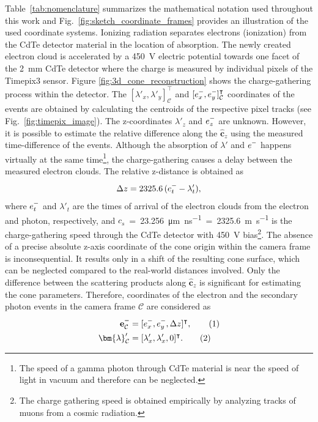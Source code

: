 \documentclass[a4paper,11pt,titlepage,twoside]{book}
\newcommand\numberthis{\addtocounter{equation}{1}\tag{\theequation}}
\newcommand{\reffig}[1]{Fig.~\ref{#1}}
\newcommand{\minus}{\scalebox{0.75}[1.0]{$-$}}
\begin{document}
Table~\ref{tab:nomenclature} summarizes the mathematical notation used throughout this work and \reffig{fig:sketch_coordinate_frames} provides an illustration of the used coordinate systems.
Ionizing radiation separates electrons (ionization) from the \ac{CdTe} detector material in the location of absorption.
The newly created electron cloud is accelerated by a \SI{450}{\volt} electric potential towards one facet of the \SI{2}{\milli\meter} \ac{CdTe} detector where the charge is measured by individual pixels of the Timepix3 sensor.
Figure \ref{fig:3d_cone_reconstruction} shows the charge-gathering process within the detector.
The $[\lambda'_x, \lambda'_y]^\intercal_\mathcal{C}$ and $[e^{\minus}_x, e^{\minus}_y]^\intercal_\mathcal{C}$ coordinates of the events are obtained by calculating the centroids of the respective pixel tracks (see \reffig{fig:timepix_image}).
The z-coordinates $\lambda'_z$ and $e^{\minus}_z$ are unknown.
However, it is possible to estimate the relative difference along the $\mathbf{\hat{c}}_z$ using the measured time-difference of the events.
Although the absorption of $\lambda'$ and $e^{\minus}$ happens virtually at the same time\footnote{The speed of a gamma photon through \ac{CdTe} material is near the speed of light in vacuum and therefore can be neglected.}, the charge-gathering causes a delay between the measured electron clouds.
The relative z-distance is obtained as
\begin{equation}
  \Delta z = 2325.6\,(e^{\minus}_t - \lambda'_t),
\end{equation}
where $e^{\minus}_t$ and $\lambda'_t$ are the times of arrival of the electron clouds from the electron and photon, respectively, and $c_s$~=~\SI{23.256}{\micro\meter\per\nano\second}~=~\SI{2325.6}{\meter\per\second} is the charge-gathering speed through the \ac{CdTe} detector with \SI{450}{\volt} bias\footnote{The charge gathering speed is obtained empirically by analyzing tracks of muons from a cosmic radiation.}.
The absence of a precise absolute z-axis coordinate of the cone origin within the camera frame is inconsequential.
It results only in a shift of the resulting cone surface, which can be neglected compared to the real-world distances involved.
Only the difference between the scattering products along $\mathbf{\hat{c}}_z$ is significant for estimating the cone parameters.
Therefore, coordinates of the electron and the secondary photon events in the camera frame $\mathcal{C}$ are considered as
\begin{align*}
  \mathbf{e}^{\minus}_{\mathcal{C}} &= [e^{\minus}_x, e^{\minus}_y, \Delta z]^\intercal,\numberthis\\
  \bm{\lambda}'_\mathcal{C} &= [\lambda'_x, \lambda'_x, 0]^\intercal.\numberthis
\end{align*}
\end{document}
